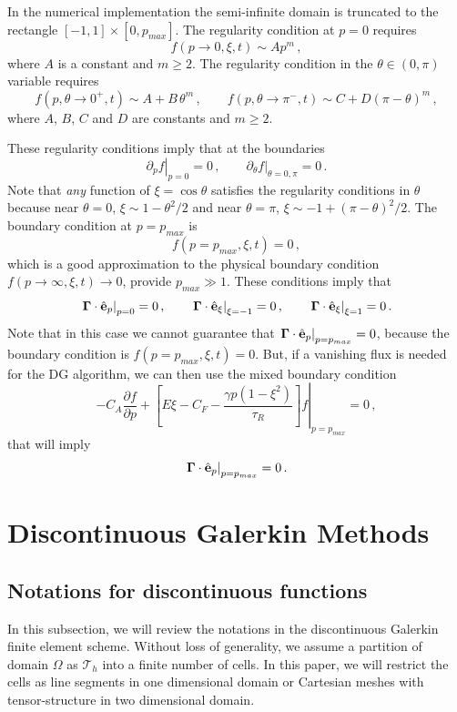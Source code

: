 \documentclass[preprint,11pt]{elsarticle}
\newcommand{\bq}{\begin{equation}}
\newcommand{\eq}{\end{equation}}
\begin{document}
In the numerical implementation the semi-infinite domain is truncated to the rectangle $[-1,1] \times [0, p_{max}]$.
The regularity condition at $p=0$ requires
\bq
f(p\rightarrow 0,\xi,t) \sim A p^m \, ,
\eq where $A$ is a constant and  $m \geq 2$.
The regularity condition in the $\theta \in (0, \pi)$ variable requires
\bq
f (p, \theta \rightarrow  0^+,t) \sim A + B\, \theta^m \, , \qquad
f (p, \theta \rightarrow  \pi^-,t) \sim C + D (\pi-\theta)^m\, ,
\eq
where $A$, $B$, $C$ and $D$ are constants and $m \geq 2$. 

These regularity conditions imply that at the boundaries
\bq
\left. \partial_p f \right|_{p=0}=0 \, , \qquad \partial_\theta f \left. \right |_{\theta=0, \pi}=0 \, .
\eq
Note that {\em any} function of $\xi = \cos \theta$ satisfies the regularity conditions in $\theta$ because near $\theta=0$, $\xi \sim 1 -\theta^2/2$ and 
 near $\theta=\pi$, $\xi \sim -1 +(\pi-\theta)^2/2$. The boundary condition at 
 $p=p_{max}$ is 
  \bq
 f(p=p_{max}, \xi, t)=0 \, ,
 \eq
which is  a good approximation to the physical boundary condition $ f(p\rightarrow \infty , \xi, t) \rightarrow 0$, provide $p_{max}\gg 1$.
These conditions imply that
\bq
\left. {\bf \Gamma} \cdot \hat {\bf e}_p \right|_{p=0}=0 \, , \qquad 
\left. {\bf \Gamma} \cdot \hat {\bf e}_\xi \right|_{\xi=-1}=0 \, , \qquad 
\left. {\bf \Gamma} \cdot \hat {\bf e}_\xi \right|_{\xi=1}=0 \, .
\eq
Note that in this case we cannot guarantee that 
$\left. {\bf \Gamma} \cdot \hat {\bf e}_p \right|_{p=p_{max}}=0$, because the boundary condition is 
$f(p=p_{max}, \xi, t)=0$. But, if  a vanishing flux is needed for the DG algorithm, we can then use the mixed boundary condition
\bq
\left. -C_A \frac{\partial f}{\partial p} + \left[ E \xi - C_F  -\frac{\gamma p \left(1-\xi^2\right)}{\tau_R}  \right] f \right|_{p=p_{max}} =0 \, ,
\eq
that will imply
\bq
\left. {\bf \Gamma} \cdot \hat {\bf e}_p \right|_{p=p_{max}}=0 \, .
\eq


\section{Discontinuous Galerkin Methods}\label{Sect:NumSch}%

\subsection{Notations for discontinuous functions}
In this subsection, we will review the notations in the discontinuous Galerkin finite element scheme.
Without loss of generality, we assume a partition of domain $\Omega$ as $\mathcal{T}_h$ into a finite number of cells. In this paper, we will restrict the cells as line segments in one dimensional domain or Cartesian meshes with tensor-structure in two dimensional domain.
\end{document}
